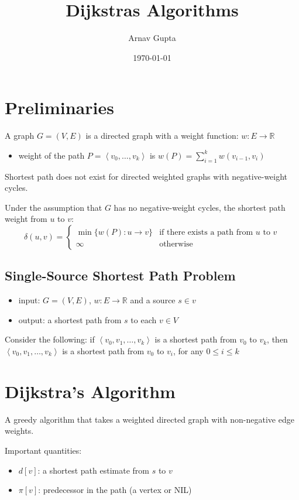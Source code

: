 \documentclass[11pt]{article}
\author{Arnav Gupta}
\date{\today}
\title{Dijkstras Algorithms}
\begin{document}
\maketitle
\tableofcontents

\section{Preliminaries}
\label{sec:org6f6cbe4}
A graph \(G = (V, E)\) is a directed graph with a weight function: \(w: E \to \mathbb{R}\)
\begin{itemize}
\item weight of the path \(P = \left< v_{0}, \dots, v_{k} \right>\) is \(w(P) = \sum_{i=1}^{k} w(v_{i-1}, v_{i})\)
\end{itemize}

Shortest path does not exist for directed weighted graphs with negative-weight cycles.

Under the assumption that \(G\) has no negative-weight cycles,
the shortest path weight from \(u\) to \(v\):
$$
        \delta(u, v) = \begin{cases}
                \min\{ w(P): u \to v \} & \text{if there exists a path from $u$ to $v$} \\
                \infty & \text{otherwise}
        \end{cases}
$$
\subsection{Single-Source Shortest Path Problem}
\label{sec:orgb4016e3}
\begin{itemize}
\item input: \(G = (V,E)\), \(w: E \to \mathbb{R}\) and a source \(s \in v\)
\item output: a shortest path from \(s\) to each \(v \in V\)
\end{itemize}

Consider the following:
if \(\left< v_{0}, v_{1}, \dots, v_{k} \right>\) is a shortest path from \(v_{0}\) to \(v_{k}\),
then \(\left< v_{0}, v_{1}, \dots, v_{k} \right>\) is a shortest path from \(v_{0}\) to \(v_{i}\),
for any \(0 \le i \le k\)
\section{Dijkstra's Algorithm}
\label{sec:orgf085249}
A greedy algorithm that takes a weighted directed graph with non-negative edge weights.

Important quantities:
\begin{itemize}
\item \(d[v]\): a shortest path estimate from \(s\) to \(v\)
\item \(\pi[v]\): predecessor in the path (a vertex or NIL)
\end{itemize}
\end{document}
